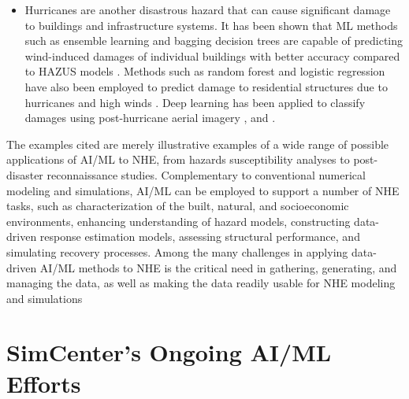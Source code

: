 \begin{itemize}
     \vspace{2mm}
 \item Hurricanes are another disastrous hazard that can cause significant damage to buildings and infrastructure systems. It has been shown that ML methods such as ensemble learning and bagging decision trees are capable of predicting wind-induced damages of individual buildings with better accuracy compared to HAZUS models \citep{subramanian2013constructing}. Methods such as random forest and logistic regression have also been employed to predict damage to residential structures due to hurricanes and high winds \citep{salazar2015predicting}. Deep learning has been applied to classify damages using post-hurricane aerial imagery \citep{thomas2011robust,li2018semisupervised}, and \citep{kersbergen2018automated}. 
\end{itemize}

The examples cited are merely illustrative examples of a wide range of possible applications of AI/ML to NHE, from hazards susceptibility analyses to post-disaster reconnaissance studies. Complementary to conventional numerical modeling and simulations, AI/ML can be employed to support a number of NHE tasks, such as characterization of the built, natural, and socioeconomic environments, enhancing understanding of hazard models, constructing data-driven response estimation models, assessing structural performance, and simulating recovery processes. Among the many challenges in applying data-driven AI/ML methods to NHE is the critical need in gathering, generating, and managing the data, as well as making the data readily usable for NHE modeling and simulations \citep{padgett2020workshop}

\section{SimCenter's Ongoing AI/ML Efforts}
\label{sec:ai_simcenter}

